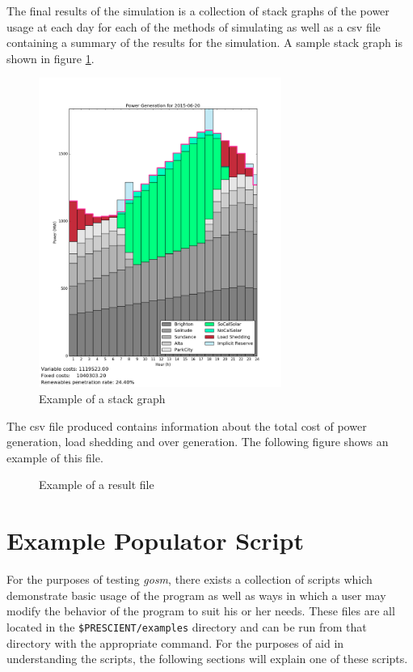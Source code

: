 \documentclass[11pt]{article}
\begin{document}
The final results of the simulation is a collection of stack graphs of the power usage at each day for each of the methods of simulating as well as a csv file containing a summary of the results for the simulation. A sample stack graph is shown in figure \ref{fig:example_stack_graph}.

\begin{figure}[h]
	\includegraphics[width=300px]{stackgraph_2015-06-20.png}
	\caption{Example of a stack graph}
	\label{fig:example_stack_graph}
\end{figure}

The csv file produced contains information about the total cost of power generation, load shedding and over generation. The following figure shows an example of this file.

\begin{figure}[H]
	\begin{framed}
		
	\end{framed}
	\caption{Example of a result file}
\end{figure}

\section{Example Populator Script}
For the purposes of testing \textit{gosm}, there exists a collection of scripts which demonstrate basic usage of the program as well as ways in which a user may modify the behavior of the program to suit his or her needs. These files are all located in the \texttt{\$PRESCIENT/examples} directory and can be run from that directory with the appropriate command. For the purposes of aid in understanding the scripts, the following sections will explain one of these scripts.
\end{document}
